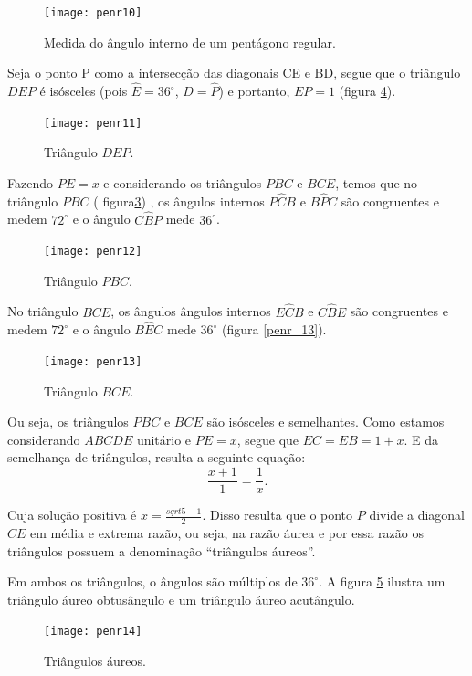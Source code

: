 \begin{figure}[H]
	\centering
	\texttt{[image: penr10]}
	\label{penr_9}
\caption{Medida do ângulo interno de um pentágono regular.}
	\end{figure}


Seja o ponto P como a intersecção das diagonais CE e BD, segue que  o triângulo $DEP$ é isósceles (pois $\hat{E}= 36^{\circ}$, $\hat{D}=\hat{P}$) e portanto, $EP=1$ (figura \ref{penr_11}). 


\begin{figure}[H]
	\centering
	\texttt{[image: penr11]}
	\label{penr_11}
\caption{Triângulo $DEP$.}
	\end{figure}


Fazendo $PE =x$ e considerando os triângulos $PBC$ e $BCE$, temos que no triângulo $PBC$ ( figura\ref{penr_12}) , os ângulos internos $P\hat{C}B$ e $B\hat{P}C$ são congruentes e medem $72^{\circ}$ e o ângulo $C\hat{B}P$ mede $36^{\circ}$. 

\begin{figure}[H]
	\centering
	\texttt{[image: penr12]}
	\label{penr_12}
\caption{Triângulo $PBC$.}
	\end{figure}


No triângulo $BCE$, os ângulos ângulos internos $E\hat{C}B$ e $C\hat{B}E$ são congruentes e medem $72^{\circ}$ e o ângulo $B\hat{E}C$ mede $36^{\circ}$ (figura \ref{penr_13}).


\begin{figure}[H]
	\centering
	\texttt{[image: penr13]}
	\label{penr_11}
\caption{Triângulo $BCE$.}
	\end{figure}


Ou seja, os triângulos $PBC$ e $BCE$ são isósceles e semelhantes. Como estamos considerando $ABCDE$ unitário e  $PE = x$, segue que $EC= EB = 1+x$. E da semelhança de triângulos, resulta a seguinte equação:
$$\frac{x+1}{1}=\frac{1}{x}.$$

Cuja solução positiva é $x=\frac{sqrt{5}-1}{2}$.
Disso resulta que o ponto $P$ divide a diagonal $CE$ em média e extrema razão, ou seja, na razão áurea e por essa razão os triângulos possuem a denominação “triângulos áureos”. 

Em ambos os triângulos, o ângulos são múltiplos de $36^{\circ}$. A figura \ref{penr_14}  ilustra um  triângulo áureo obtusângulo e um  triângulo áureo acutângulo.

 \begin{figure}[H]
	\centering
	\texttt{[image: penr14]}
	\label{penr_14}
\caption{Triângulos áureos.}
	\end{figure}



